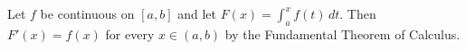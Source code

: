 Let $f$ be continuous on $[a, b]$ and let $F(x) = \int_{a}^{x} f(t) \,dt$.
Then $F'(x) = f(x)$ for every $x \in (a, b)$ by the Fundamental Theorem of Calculus.